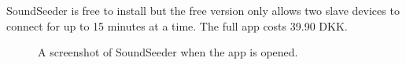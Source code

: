 SoundSeeder is free to install but the free version only allows two slave devices to connect for up to 15 minutes at a time.
The full app costs 39.90 DKK. 

\begin{figure}[h!]
    \setlength{\fboxsep}{0pt}
    \setlength{\fboxrule}{2pt}
    \begin{minipage}[b]{0.45\textwidth}
        \centering    
        \caption{A screenshot of SoundSeeder when the app is opened.}\label{fig:soundseeder_screenshot}
    \end{minipage}
    \hfill
    \begin{minipage}[b]{0.45\textwidth}
        \centering

\end{minipage}
\end{figure}
